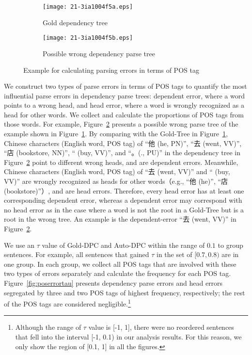 \documentclass[english]{jnlp_1.4}
\begin{document}
\begin{figure}[b]
\begin{subfigure}{1\textwidth}
\begin{center}
\texttt{[image: 21-3ia1004f5a.eps]}
\end{center}
\caption{Gold dependency tree}
\label{fig:errex}
\end{subfigure}
\vspace{0.5\Cvs}

\begin{subfigure}{1\textwidth}
\begin{center}
\texttt{[image: 21-3ia1004f5b.eps]}
\end{center}
\caption{Possible wrong dependency parse tree}
\label{fig:poserr}
\end{subfigure}
\caption{Example for calculating parsing errors in terms of POS tag}
\label{fig:poserror}
\end{figure}


We construct two types of parse errors in terms of POS tags to quantify the most influential
parse errors in dependency parse trees: dependent error, where a word points to a wrong head, 
and head error, where a word is wrongly recognized as a head for other words. We collect and calculate the 
proportions of POS tags from those words. For example, Figure~\ref{fig:poserr} 
presents a possible wrong parse tree of the example shown in Figure~\ref{fig:errex}.
By comparing with the Gold-Tree in Figure~\ref{fig:errex}, Chinese characters 
(English word, POS tag) of ``他 (he, PN)'', ``去 (went, VV)'', ``店 (bookstore, NN)'', 
`` (buy, VV)'', and ``。(., PU)'' in the dependency tree in Figure~\ref{fig:poserr}
point to different wrong heads, and are dependent errors. Meanwhile, Chinese 
characters (English word, POS tag) of ``去 (went, VV)'' and `` (buy, VV)'' are 
wrongly recognized as heads for other words（e.g., ``他 (he)'', ``店 (bookstore)''）,
and are head errors. Therefore, every head error has at least one corresponding 
dependent error, whereas a dependent error may correspond with no head error as in 
the case where a word is not the root in a Gold-Tree but is a root in the wrong tree.
An example is the dependent-error ``去 (went, VV)'' in Figure~\ref{fig:poserr}.

We use an $\tau$ value of Gold-DPC and Auto-DPC within the range of $0.1$ to group 
sentences. For example, all sentences that gained $\tau$ in the set of $[0.7, 0.8)$ 
are in one group. In each group, we collect all POS tags that are involved with 
these two types of errors separately and calculate the frequency for each POS tag.
Figure~\ref{fig:poserrortau} presents dependency parse errors and head errors segregated
by three and two POS tags of highest frequency, respectively;
the rest of the POS tags
are considered negligible.\footnote{Although the range of $\tau$ value is [-1, 1], 
there were no reordered sentences that fell into the interval [-1, 0.1) in our analysis
results. For this reason, we only show the region of [0.1, 1] in all the figures.}
\end{document}
